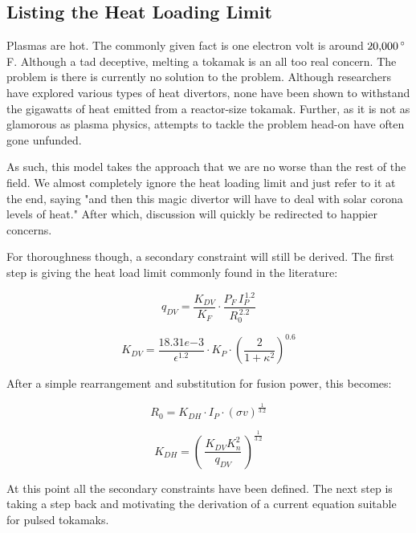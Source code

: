 \subsection{Listing the Heat Loading Limit}

Plasmas are hot. The commonly given fact is one electron volt is around $20\textnormal{,}000 \, {}^\circ$F. Although a tad deceptive, melting a tokamak is an all too real concern. The problem is there is currently no solution to the problem. Although researchers have explored various types of heat divertors, none have been shown to withstand the gigawatts of heat emitted from a reactor-size tokamak. Further, as it is not as glamorous as plasma physics, attempts to tackle the problem head-on have often gone unfunded. \cite{adx}

As such, this model takes the approach that we are no worse than the rest of the field. We almost completely ignore the heat loading limit and just refer to it at the end, saying "and then this magic divertor will have to deal with solar corona levels of heat." After which, discussion will quickly be redirected to happier concerns. 

For thoroughness though, a secondary constraint will still be derived. The first step is giving the heat load limit commonly found in the literature: \cite{minervini}

\begin{equation}
  q_{DV} = \frac{ K_{DV} }{ K_F} \cdot \frac{ P_F \, I_P^{\,1.2} }{ R_0^{\,2.2} }
\end{equation}

\begin{equation}
	K_{DV} = \frac{18.31e{-3}}{\epsilon^{1.2}} \cdot K_P \cdot \left( \frac{2}{1+\kappa^2} \right) ^ {0.6}
\end{equation}

After a simple rearrangement and substitution for fusion power, this becomes:

\begin{equation}
	\label{eq:r_heat}
	R_0 = K_{DH} \cdot I_P \cdot (\sigma v)^ {\frac{1}{3.2}} 
\end{equation}

\begin{equation}
	K_{DH} = \left( \, \frac{ K_{DV} K_n^2 }{ q_{DV} } \, \right) ^ {\frac{1}{3.2}}
\end{equation}

At this point all the secondary constraints have been defined. The next step is taking a step back and motivating the derivation of a current equation suitable for pulsed tokamaks.


